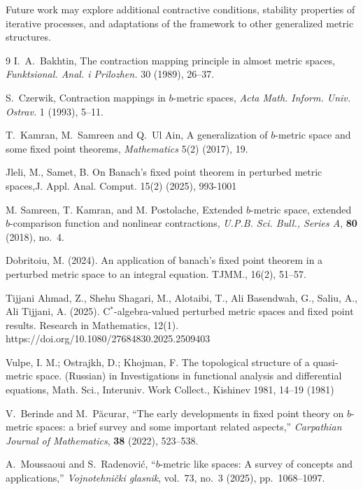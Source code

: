 \documentclass[sn-mathphys-num]{sn-jnl}%
\theoremstyle{thmstyleone}%
\theoremstyle{thmstyletwo}%
\theoremstyle{thmstylethree}%
\numberwithin{equation}{section}
\begin{document}
Future work may explore additional contractive conditions, stability 
properties of iterative processes, and adaptations of the framework to other 
generalized metric structures.






\begin{thebibliography}{9}
I.~A.~Bakhtin, 
The contraction mapping principle in almost metric spaces, 
\emph{Funktsional. Anal. i Prilozhen.} 30 (1989), 26--37.

S.~Czerwik, 
Contraction mappings in $b$-metric spaces, 
\emph{Acta Math. Inform. Univ. Ostrav.} 1 (1993), 5--11.


T.~Kamran, M.~Samreen and Q.~Ul Ain, 
A generalization of $b$-metric space and some fixed point theorems, 
\emph{Mathematics} 5(2) (2017), 19.

Jleli, M., Samet, B. On Banach’s fixed point theorem in perturbed metric spaces,J. Appl. Anal. Comput. 15(2) (2025), 993-1001

M. Samreen, T. Kamran, and M. Postolache,
Extended $b$-metric space, extended $b$-comparison function and nonlinear contractions,
\textit{U.P.B. Sci. Bull., Series A}, \textbf{80} (2018), no.~4.

Dobritoiu, M. (2024). An application of banach’s fixed point theorem in a perturbed metric space to an integral equation. TJMM., 16(2), 51–57. 

 Tijjani Ahmad, Z., Shehu Shagari, M., Alotaibi, T., Ali Basendwah, G., Saliu, A.,  Ali Tijjani, A. (2025). C$^{\ast}$-algebra-valued perturbed metric spaces and fixed point results. Research in Mathematics, 12(1). https://doi.org/10.1080/27684830.2025.2509403


Vulpe, I. M.; Ostrajkh, D.; Khojman, F. The topological structure of a quasi-metric space. (Russian) in
Investigations in functional analysis and differential equations, Math. Sci., Interuniv. Work Collect., Kishinev
1981, 14–19 (1981)

V.~Berinde and M.~Păcurar,
``The early developments in fixed point theory on $b$-metric spaces: a brief survey and some important related aspects,''
\emph{Carpathian Journal of Mathematics}, \textbf{38} (2022), 523--538.

A.~Moussaoui and S.~Radenović,
``$b$-metric like spaces: A survey of concepts and applications,''
\emph{Vojnotehnički glasnik}, vol.~73, no.~3 (2025), pp.~1068--1097.




\end{thebibliography}
\end{document}
